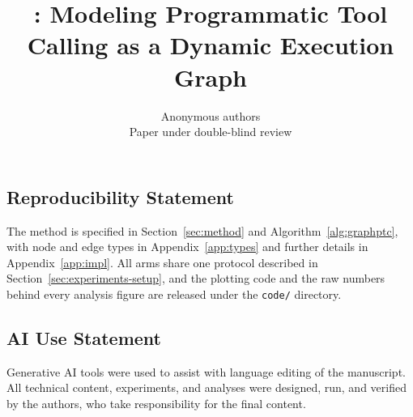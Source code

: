 \documentclass{article}
\title{\method: Modeling Programmatic Tool Calling as a Dynamic Execution Graph}
\author{Anonymous authors\\
Paper under double-blind review}
\begin{document}
\maketitle









\subsection*{Reproducibility Statement}
The method is specified in Section~\ref{sec:method} and Algorithm~\ref{alg:graphptc}, with node and edge types in Appendix~\ref{app:types} and further details in Appendix~\ref{app:impl}. All arms share one protocol described in Section~\ref{sec:experiments-setup}, and the plotting code and the raw numbers behind every analysis figure are released under the \texttt{code/} directory.

\subsection*{AI Use Statement}
Generative AI tools were used to assist with language editing of the manuscript. All technical content, experiments, and analyses were designed, run, and verified by the authors, who take responsibility for the final content.




\appendix

\end{document}
